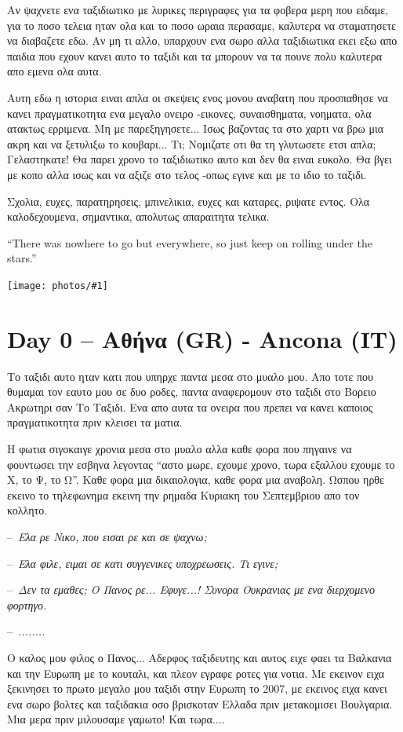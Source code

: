 \documentclass[11pt, letterpaper]{book}
\newcommand\dialogue[1]{\par\noindent--~\textit{#1}}
\newcommand\photo[1]{\begin{center}\noindent\texttt{[image: photos/\#1]}\end{center}}
\begin{document}
Αν ψαχνετε ενα ταξιδιωτικο με λυρικες περιγραφες για τα φοβερα μερη που ειδαμε, για το ποσο τελεια ηταν ολα και το ποσο ωραια περασαμε, καλυτερα να σταματησετε να διαβαζετε εδω. Αν μη τι αλλο, υπαρχουν ενα σωρο αλλα ταξιδιωτικα εκει εξω απο παιδια που εχουν κανει αυτο το ταξιδι και τα μπορουν να τα πουνε πολυ καλυτερα απο εμενα ολα αυτα.

Αυτη εδω η ιστορια ειναι απλα οι σκεψεις ενος μονου αναβατη που προσπαθησε να κανει πραγματικοτητα ενα μεγαλο ονειρο -εικονες, συναισθηματα, νοηματα, ολα ατακτως ερριμενα.
Μη με παρεξηγησετε... Ισως βαζοντας τα στο χαρτι να βρω μια ακρη και να ξετυλιξω το κουβαρι...
Τι; Νομιζατε οτι θα τη γλυτωσετε ετσι απλα; Γελαστηκατε! Θα παρει χρονο το ταξιδιωτικο αυτο και δεν θα ειναι ευκολο.
Θα βγει με κοπο αλλα ισως και να αξιζε στο τελος -οπως εγινε και με το ιδιο το ταξιδι.

Σχολια, ευχες, παρατηρησεις, μπινελικια, ευχες και καταρες, ριψατε εντος. Ολα καλοδεχουμενα, σημαντικα, απολυτως απαραιτητα τελικα.

``There was nowhere to go but everywhere, so just keep on rolling under the stars.''

\photo{1.jpg}

\chapter{Day 0 -- Αθήνα (GR) - Ancona (IT)}

Το ταξιδι αυτο ηταν κατι που υπηρχε παντα μεσα στο μυαλο μου. Απο τοτε που θυμαμαι τον εαυτο μου σε δυο ροδες, παντα αναφερομουν στο ταξιδι στο Βορειο Ακρωτηρι σαν Το Ταξιδι. Eνα απο αυτα τα ονειρα που πρεπει να κανει καποιος πραγματικοτητα πριν κλεισει τα ματια.

Η φωτια σιγοκαιγε χρονια μεσα στο μυαλο αλλα καθε φορα που πηγαινε να φουντωσει την εσβηνα λεγοντας ``αστο μωρε, εχουμε χρονο, τωρα εξαλλου εχουμε το Χ, το Ψ, το Ω''. Καθε φορα μια δικαιολογια, καθε φορα μια αναβολη. Ωσπου ηρθε εκεινο το τηλεφωνημα εκεινη την ρημαδα Κυριακη του Σεπτεμβριου απο τον κολλητο.

\dialogue{Ελα ρε Νικο, που εισαι ρε και σε ψαχνω;}
\dialogue{Ελα φιλε, ειμαι σε κατι συγγενικες υποχρεωσεις. Τι εγινε;}
\dialogue{Δεν τα εμαθες; Ο Πανος ρε... Εφυγε...! Συνορα Ουκρανιας με ενα διερχομενο φορτηγο.}
\dialogue{........}

Ο καλος μου φιλος ο Πανος... Αδερφος ταξιδευτης και αυτος ειχε φαει τα Βαλκανια και την Ευρωπη με το κουταλι, και πλεον εγραφε ροτες για νοτια. Με εκεινον ειχα ξεκινησει το πρωτο μεγαλο μου ταξιδι στην Ευρωπη το 2007, με εκεινος ειχα κανει ενα σωρο βολτες και ταξιδακια οσο βρισκοταν Ελλαδα πριν μετακομισει Βουλγαρια. Μια μερα πριν μιλουσαμε γαμωτο! Και τωρα....
\end{document}
